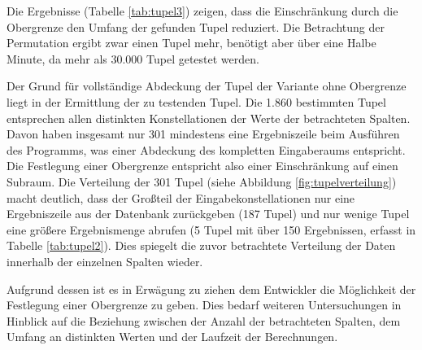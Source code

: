 Die Ergebnisse (Tabelle \ref{tab:tupel3}) zeigen, dass die Einschränkung durch die Obergrenze den Umfang der gefunden Tupel reduziert.
Die Betrachtung der Permutation ergibt zwar einen Tupel mehr, benötigt aber über eine Halbe Minute, da mehr als 30.000 Tupel getestet werden.

\begin{table}[h]
	\centering
	\caption{Vergleich der Ansätze}
	\label{tab:tupel3}
\end{table}

Der Grund für vollständige Abdeckung der Tupel der Variante ohne Obergrenze liegt in der Ermittlung der zu testenden Tupel.
Die 1.860 bestimmten Tupel entsprechen allen distinkten Konstellationen der Werte der betrachteten Spalten.
Davon haben insgesamt nur 301 mindestens eine Ergebniszeile beim Ausführen des Programms, was einer Abdeckung des kompletten Eingaberaums entspricht.
Die Festlegung einer Obergrenze entspricht also einer Einschränkung auf einen Subraum.
Die Verteilung der 301 Tupel (siehe Abbildung \ref{fig:tupelverteilung}) macht deutlich, dass der Großteil der Eingabekonstellationen nur eine Ergebniszeile aus der Datenbank zurückgeben (187 Tupel) und nur wenige Tupel eine größere Ergebnismenge abrufen (5 Tupel mit über 150 Ergebnissen, erfasst in Tabelle \ref{tab:tupel2}).
Dies spiegelt die zuvor betrachtete Verteilung der Daten innerhalb der einzelnen Spalten wieder.

Aufgrund dessen ist es in Erwägung zu ziehen dem Entwickler die Möglichkeit der Festlegung einer Obergrenze zu geben.
Dies bedarf weiteren Untersuchungen in Hinblick auf die Beziehung zwischen der Anzahl der betrachteten Spalten, dem Umfang an distinkten Werten und der Laufzeit der Berechnungen.

